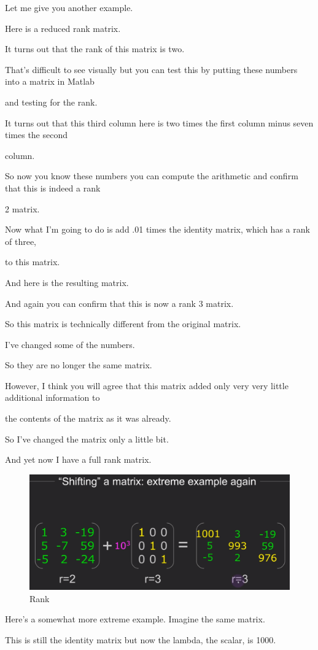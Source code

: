 \documentclass[fleqn,10pt]{olplainarticle}
\theoremstyle{definition}
\theoremstyle{remark}
\begin{document}
Let me give you another example.

Here is a reduced rank matrix.

It turns out that the rank of this matrix is two.

That's difficult to see visually but you can test this by putting these numbers into a matrix in Matlab

and testing for the rank.

It turns out that this third column here is two times the first column minus seven times the second

column.

So now you know these numbers you can compute the arithmetic and confirm that this is indeed a rank

2 matrix.

Now what I'm going to do is add .01 times the identity matrix, which has a rank of three,

to this matrix.

And here is the resulting matrix.

And again you can confirm that this is now a rank 3 matrix.

So this matrix is technically different from the original matrix.

I've changed some of the numbers.

So they are no longer the same matrix.

However, I think you will agree that this matrix added only very very little additional information to

the contents of the matrix as it was already.

So I've changed the matrix only a little bit.

And yet now I have a full rank matrix.

\begin{figure}[ht]
	\centering
	\includegraphics[width=0.5\linewidth]{images/rank-32.png}
	\caption{Rank}
	\label{fig:rank_32}
\end{figure}

Here's a somewhat more extreme example. Imagine the same matrix.

This is still the identity matrix but now the lambda, the scalar, is 1000.
\end{document}
